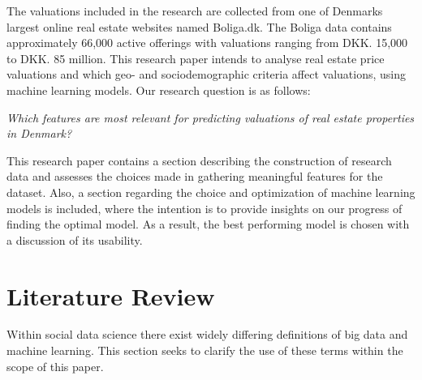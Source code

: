 \documentclass[12pt,a4paper]{article}
\begin{document}
The valuations included in the research are collected from one of Denmarks largest online real estate websites named Boliga.dk. The Boliga data contains approximately 66,000 active offerings with valuations ranging from DKK. 15,000 to DKK. 85 million. This research paper intends to analyse real estate price valuations and which geo- and sociodemographic criteria affect valuations, using machine learning models. Our research question is as follows: 
\begin{center}
 \textit{Which features are most relevant for predicting valuations of real estate properties in Denmark?}
\end{center}
This research paper contains a section describing the construction of research data and assesses the choices made in gathering meaningful features for the dataset. Also, a section regarding the choice and optimization of machine learning models is included, where the intention is to provide insights on our progress of finding the optimal model. As a result, the best performing model is chosen with a discussion of its usability. 

\section{Literature Review}
Within social data science there exist widely differing definitions of big data and machine learning. This section seeks to clarify the use of these terms within the scope of this paper.
\end{document}
